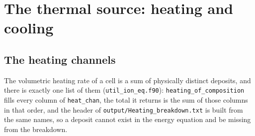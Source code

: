 \section{The thermal source: heating and cooling}
\label{sec:thermal}

\subsection{The heating channels}
\label{sec:thermal:heat}

The volumetric heating rate of a cell is a sum of physically distinct
deposits, and there is exactly one list of them
(\texttt{util\_ion\_eq.f90}): \texttt{heating\_of\_composition} fills every
column of \texttt{heat\_chan}, the total it returns is the sum of those
columns in that order, and the header of \texttt{output/Heating\_breakdown.txt}
is built from the same names, so a deposit cannot exist in the energy
equation and be missing from the breakdown.

